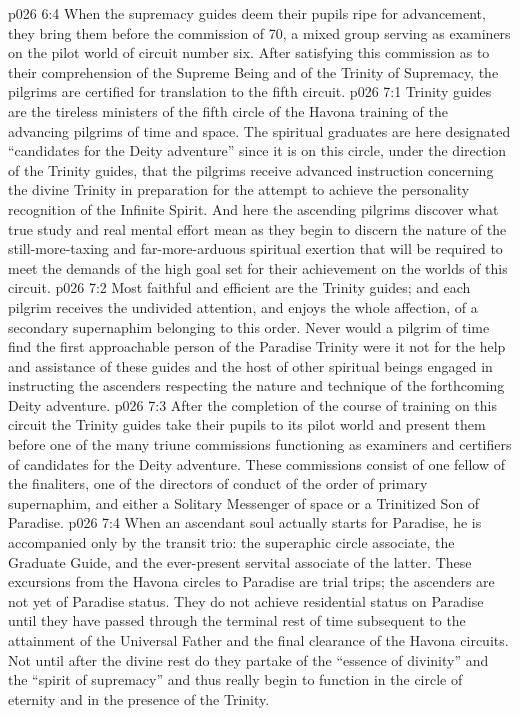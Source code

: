 \vs p026 6:4 When the supremacy guides deem their pupils ripe for advancement, they bring them before the commission of 70, a mixed group serving as examiners on the pilot world of circuit number six. After satisfying this commission as to their comprehension of the Supreme Being and of the Trinity of Supremacy, the pilgrims are certified for translation to the fifth circuit.
\vs p026 7:1 Trinity guides are the tireless ministers of the fifth circle of the Havona training of the advancing pilgrims of time and space. The spiritual graduates are here designated “candidates for the Deity adventure” since it is on this circle, under the direction of the Trinity guides, that the pilgrims receive advanced instruction concerning the divine Trinity in preparation for the attempt to achieve the personality recognition of the Infinite Spirit. And here the ascending pilgrims discover what true study and real mental effort mean as they begin to discern the nature of the still\hyp{}more\hyp{}taxing and far\hyp{}more\hyp{}arduous spiritual exertion that will be required to meet the demands of the high goal set for their achievement on the worlds of this circuit.
\vs p026 7:2 Most faithful and efficient are the Trinity guides; and each pilgrim receives the undivided attention, and enjoys the whole affection, of a secondary supernaphim belonging to this order. Never would a pilgrim of time find the first approachable person of the Paradise Trinity were it not for the help and assistance of these guides and the host of other spiritual beings engaged in instructing the ascenders respecting the nature and technique of the forthcoming Deity adventure.
\vs p026 7:3 After the completion of the course of training on this circuit the Trinity guides take their pupils to its pilot world and present them before one of the many triune commissions functioning as examiners and certifiers of candidates for the Deity adventure. These commissions consist of one fellow of the finaliters, one of the directors of conduct of the order of primary supernaphim, and either a Solitary Messenger of space or a Trinitized Son of Paradise.
\vs p026 7:4 When an ascendant soul actually starts for Paradise, he is accompanied only by the transit trio: the superaphic circle associate, the Graduate Guide, and the ever\hyp{}present servital associate of the latter. These excursions from the Havona circles to Paradise are trial trips; the ascenders are not yet of Paradise status. They do not achieve residential status on Paradise until they have passed through the terminal rest of time subsequent to the attainment of the Universal Father and the final clearance of the Havona circuits. Not until after the divine rest do they partake of the “essence of divinity” and the “spirit of supremacy” and thus really begin to function in the circle of eternity and in the presence of the Trinity.
